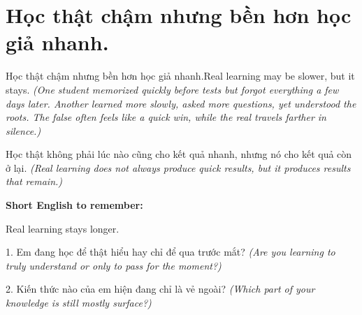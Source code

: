 \section{Học thật chậm nhưng bền hơn học giả nhanh.}
\begin{truyen}{Học thật chậm nhưng bền hơn học giả nhanh.}{Real learning may be slower, but it stays.}
\textit{(One student memorized quickly before tests but forgot everything a few days later. Another learned more slowly, asked more questions, yet understood the roots. The false often feels like a quick win, while the real travels farther in silence.)}
\end{truyen}
\begin{baihoc}
Học thật không phải lúc nào cũng cho kết quả nhanh, nhưng nó cho kết quả còn ở lại.
\textit{(Real learning does not always produce quick results, but it produces results that remain.)}
\end{baihoc}
\begin{ghinhoanh}
\textbf{Short English to remember:}

Real learning stays longer.
\end{ghinhoanh}
\begin{tuhocnhanh}
1. Em đang học để thật hiểu hay chỉ để qua trước mắt? \textit{(Are you learning to truly understand or only to pass for the moment?)}

2. Kiến thức nào của em hiện đang chỉ là vẻ ngoài? \textit{(Which part of your knowledge is still mostly surface?)}
\end{tuhocnhanh}
\ngancach

